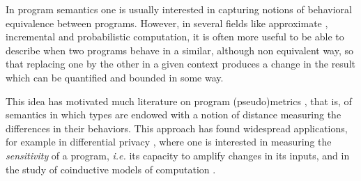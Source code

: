 
In program semantics one is usually interested in capturing notions of behavioral equivalence between programs. However,  
in several fields like approximate \cite{Mittal2016}, incremental \cite{Cai2014, Picallo2019} and probabilistic \cite{10.1109/LICS.2015.64} computation, it is often more useful to be able to describe when two programs behave in a similar, although non equivalent way, so that replacing one by the other in a given context produces a change in the result which can be quantified and bounded in some way.



This idea has motivated much literature on program (pseudo)metrics \cite{ARNOLD1980181, VANBREUGEL20011,Azevedo_de_Amorim_2017, Escardo1999, BAIER1994171,10.1109/LICS.2015.64, 10.1007/978-3-662-44584-6_4, 10.1007/978-3-662-54434-1_13, 10.1145/3209108.3209149}, that is, of semantics in which types are endowed with a notion of distance measuring the differences in their behaviors. This approach has found widespread applications, for example in differential privacy \cite{10.1145/1932681.1863568, 10.1007/978-3-642-29420-4_3, Barthe_2012}, where one is interested in measuring the \emph{sensitivity} of a program, \textit{i.e.} its capacity to amplify changes in its inputs, and in the study of coinductive models of computation \cite{DESHARNAIS2004323, VANBREUGEL2005115, 10.1007/978-3-662-44584-6_4,10.1007/3-540-48224-5_35}.
%

 
 
 
% 
% 
    
